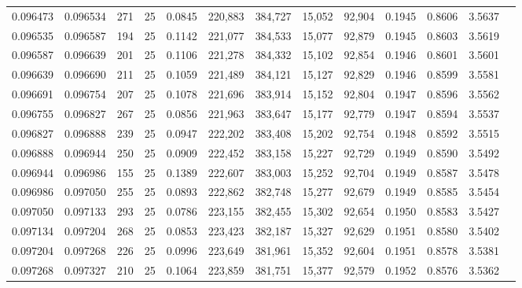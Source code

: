 \begin{tabular}{rrrrrrrrrrrrr}
0.096473 & 0.096534 &   271 &  25 &                                     0.0845 & 220,883 & 384,727 &  15,052 &  92,904 & 0.1945 & 0.8606 & 3.5637 \\
0.096535 & 0.096587 &   194 &  25 &                                     0.1142 & 221,077 & 384,533 &  15,077 &  92,879 & 0.1945 & 0.8603 & 3.5619 \\
0.096587 & 0.096639 &   201 &  25 &                                     0.1106 & 221,278 & 384,332 &  15,102 &  92,854 & 0.1946 & 0.8601 & 3.5601 \\
0.096639 & 0.096690 &   211 &  25 &                                     0.1059 & 221,489 & 384,121 &  15,127 &  92,829 & 0.1946 & 0.8599 & 3.5581 \\
0.096691 & 0.096754 &   207 &  25 &                                     0.1078 & 221,696 & 383,914 &  15,152 &  92,804 & 0.1947 & 0.8596 & 3.5562 \\
0.096755 & 0.096827 &   267 &  25 &                                     0.0856 & 221,963 & 383,647 &  15,177 &  92,779 & 0.1947 & 0.8594 & 3.5537 \\
0.096827 & 0.096888 &   239 &  25 &                                     0.0947 & 222,202 & 383,408 &  15,202 &  92,754 & 0.1948 & 0.8592 & 3.5515 \\
0.096888 & 0.096944 &   250 &  25 &                                     0.0909 & 222,452 & 383,158 &  15,227 &  92,729 & 0.1949 & 0.8590 & 3.5492 \\
0.096944 & 0.096986 &   155 &  25 &                                     0.1389 & 222,607 & 383,003 &  15,252 &  92,704 & 0.1949 & 0.8587 & 3.5478 \\
0.096986 & 0.097050 &   255 &  25 &                                     0.0893 & 222,862 & 382,748 &  15,277 &  92,679 & 0.1949 & 0.8585 & 3.5454 \\
0.097050 & 0.097133 &   293 &  25 &                                     0.0786 & 223,155 & 382,455 &  15,302 &  92,654 & 0.1950 & 0.8583 & 3.5427 \\
0.097134 & 0.097204 &   268 &  25 &                                     0.0853 & 223,423 & 382,187 &  15,327 &  92,629 & 0.1951 & 0.8580 & 3.5402 \\
0.097204 & 0.097268 &   226 &  25 &                                     0.0996 & 223,649 & 381,961 &  15,352 &  92,604 & 0.1951 & 0.8578 & 3.5381 \\
0.097268 & 0.097327 &   210 &  25 &                                     0.1064 & 223,859 & 381,751 &  15,377 &  92,579 & 0.1952 & 0.8576 & 3.5362 \\

\end{tabular}
